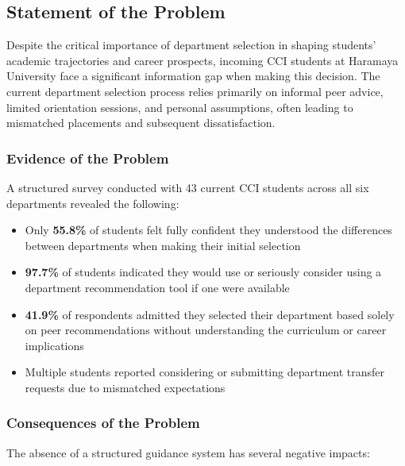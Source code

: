 \documentclass[12pt, a4paper]{article}
\begin{document}
\subsection{Statement of the Problem}

Despite the critical importance of department selection in shaping students' academic trajectories and career prospects, incoming CCI students at Haramaya University face a significant information gap when making this decision. The current department selection process relies primarily on informal peer advice, limited orientation sessions, and personal assumptions, often leading to mismatched placements and subsequent dissatisfaction.

\subsubsection*{Evidence of the Problem}

A structured survey conducted with 43 current CCI students across all six departments revealed the following:

\begin{itemize}[leftmargin=1.5em, itemsep=3pt]
    \item Only \textbf{55.8\%} of students felt fully confident they understood the differences between departments when making their initial selection
    \item \textbf{97.7\%} of students indicated they would use or seriously consider using a department recommendation tool if one were available
    \item \textbf{41.9\%} of respondents admitted they selected their department based solely on peer recommendations without understanding the curriculum or career implications
    \item Multiple students reported considering or submitting department transfer requests due to mismatched expectations
\end{itemize}

\subsubsection*{Consequences of the Problem}

The absence of a structured guidance system has several negative impacts:
\end{document}
